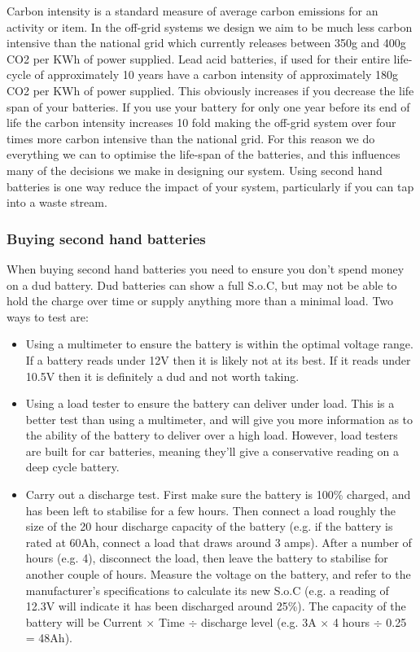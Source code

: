 \documentclass{article}
\theoremstyle{definition}
\theoremstyle{definition}
\theoremstyle{remark}
\begin{document}
      Carbon intensity is a standard measure of average carbon emissions for an activity or item. In the off-grid systems we design we aim to be much less carbon intensive than the national grid which currently releases between 350g and 400g CO2 per KWh of power supplied. Lead acid batteries, if used for their entire life-cycle of approximately 10 years have a carbon intensity of approximately 180g CO2 per KWh of power supplied. This obviously increases if you decrease the life span of your batteries. If you use your battery for only one year before its end of life the carbon intensity increases 10 fold making the off-grid system over four times more carbon intensive than the national grid. For this reason we do everything we can to optimise the life-span of the batteries, and this influences many of the decisions we make in designing our system. Using second hand batteries is one way reduce the impact of your system, particularly if you can tap into a waste stream. 
    

    \subsubsection{Buying second hand batteries} %
    \label{ssub:buying_second_hand_batteries}

      When buying second hand batteries you need to ensure you don't spend money on a dud battery. Dud batteries can show a full S.o.C, but may not be able to hold the charge over time or supply anything more than a minimal load. Two ways to test are:

        \begin{itemize}
          \item Using a multimeter to ensure the battery is within the optimal voltage range. If a battery reads under 12V then it is likely not at its best. If it reads under 10.5V then it is definitely a dud and not worth taking. 
          \item Using a load tester to ensure the battery can deliver under load. This is a better test than using a multimeter, and will give you more information as to the ability of the battery to deliver over a high load. However, load testers are built for car batteries, meaning they'll give a conservative reading on a deep cycle battery.
          \item Carry out a discharge test. First make sure the battery is 100\% charged, and has been left to stabilise for a few hours. Then connect a load roughly the size of the 20 hour discharge capacity of the battery (e.g. if the battery is rated at 60Ah, connect a load that draws around 3 amps). After a number of hours (e.g. 4), disconnect the load, then leave the battery to stabilise for another couple of hours. Measure the voltage on the battery, and refer to the manufacturer’s specifications to calculate its new S.o.C (e.g. a reading of 12.3V will indicate it has been discharged around 25\%). The capacity of the battery will be Current \(\times\) Time \(\div\) discharge level (e.g. 3A \(\times\) 4 hours \(\div\) 0.25 = 48Ah).
        \end{itemize}
    
\end{document}
